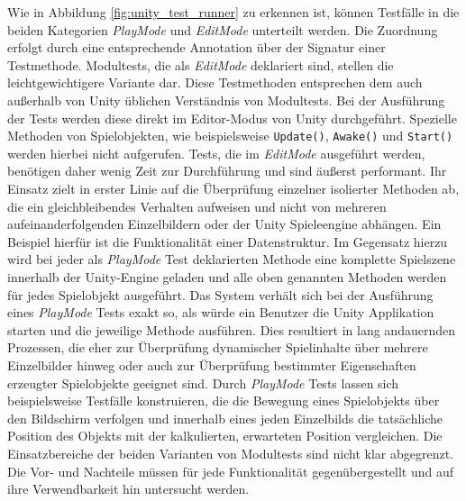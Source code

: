 Wie in Abbildung \ref{fig:unity_test_runner} zu erkennen ist, können Testfälle in die beiden Kategorien \textit{PlayMode} und \textit{EditMode} unterteilt werden. Die Zuordnung erfolgt durch eine entsprechende Annotation über der Signatur einer Testmethode. Modultests, die als \textit{EditMode} deklariert sind, stellen die leichtgewichtigere Variante dar. Diese Testmethoden entsprechen dem auch außerhalb von Unity üblichen Verständnis von Modultests. Bei der Ausführung der Tests werden diese direkt im Editor-Modus von Unity durchgeführt. Spezielle Methoden von Spielobjekten, wie beispielsweise \texttt{Update()}, \texttt{Awake()} und \texttt{Start()} werden hierbei nicht aufgerufen. Tests, die im \textit{EditMode} ausgeführt werden, benötigen daher wenig Zeit zur Durchführung und sind äußerst performant. Ihr Einsatz zielt in erster Linie auf die Überprüfung einzelner isolierter Methoden ab, die ein gleichbleibendes Verhalten aufweisen und nicht von mehreren aufeinanderfolgenden Einzelbildern oder der Unity Spieleengine abhängen. Ein Beispiel hierfür ist die Funktionalität einer Datenstruktur. Im Gegensatz hierzu wird bei jeder als \textit{PlayMode} Test deklarierten Methode eine komplette Spielszene innerhalb der Unity-Engine geladen und alle oben genannten Methoden werden für jedes Spielobjekt ausgeführt. Das System verhält sich bei der Ausführung eines \textit{PlayMode} Tests exakt so, als würde ein Benutzer die Unity Applikation starten und die jeweilige Methode ausführen. Dies resultiert in lang andauernden Prozessen, die eher zur Überprüfung dynamischer Spielinhalte über mehrere Einzelbilder hinweg oder auch zur Überprüfung bestimmter Eigenschaften erzeugter Spielobjekte geeignet sind. Durch \textit{PlayMode} Tests lassen sich beispielsweise Testfälle konstruieren, die die Bewegung eines Spielobjekts über den Bildschirm verfolgen und innerhalb eines jeden Einzelbilds die tatsächliche Position des Objekts mit der kalkulierten, erwarteten Position vergleichen. Die Einsatzbereiche der beiden Varianten von Modultests sind nicht klar abgegrenzt. Die Vor- und Nachteile müssen für jede Funktionalität gegenübergestellt und auf ihre Verwendbarkeit hin untersucht werden.  

%




